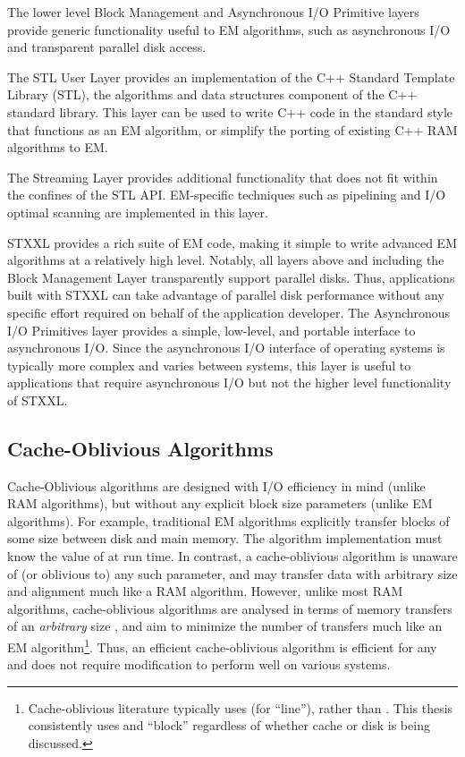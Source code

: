 \documentclass[12pt]{carletoncsthesis}
\begin{document}
The lower level Block Management and Asynchronous I/O Primitive layers provide
generic functionality useful to EM algorithms, such as asynchronous
I/O and transparent parallel disk access.

The STL User Layer provides an implementation of the C++ Standard Template
Library (STL), the algorithms and data structures component of the C++
standard library.  This layer can be used to write C++ code in the standard
style that functions as an EM algorithm, or simplify the porting of existing
C++ RAM algorithms to EM.

The Streaming Layer provides additional functionality that does not fit
within the confines of the STL API.  EM-specific techniques such as pipelining
and I/O optimal scanning are implemented in this layer.

STXXL provides a rich suite of EM code, making it simple to write advanced
EM algorithms at a relatively high level.  Notably, all layers above and
including the Block Management Layer transparently support parallel disks.
Thus, applications built with STXXL can take advantage of parallel disk
performance without any specific effort required on behalf of the
application developer.  The Asynchronous I/O Primitives layer provides a
simple, low-level, and portable interface to asynchronous I/O.  Since the
asynchronous I/O interface of operating systems is typically more complex
and varies between systems, this layer is useful to applications that require
asynchronous I/O but not the higher level functionality of STXXL.

\subsection{Cache-Oblivious Algorithms}


Cache-Oblivious algorithms \cite{cacheoblivious} are designed with I/O
efficiency in mind (unlike RAM algorithms), but without any explicit
block size parameters (unlike EM algorithms).  For example, traditional
EM algorithms explicitly transfer blocks of some size  between disk
and main memory.  The algorithm implementation must know the value of 
at run time.  In contrast, a cache-oblivious algorithm is unaware of (or
oblivious to) any such parameter, and may transfer data with arbitrary size
and alignment much like a RAM algorithm.  However, unlike most RAM algorithms,
cache-oblivious algorithms are analysed in terms of memory transfers of an
{\em arbitrary} size , and aim to minimize the number of transfers much
like an EM algorithm\footnote{Cache-oblivious literature typically uses
 (for ``line''), rather than .  This thesis consistently uses  and
``block'' regardless of whether cache or disk is being discussed.}. Thus,
an efficient cache-oblivious algorithm is efficient for any  and does
not require modification to perform well on various systems.
\end{document}

